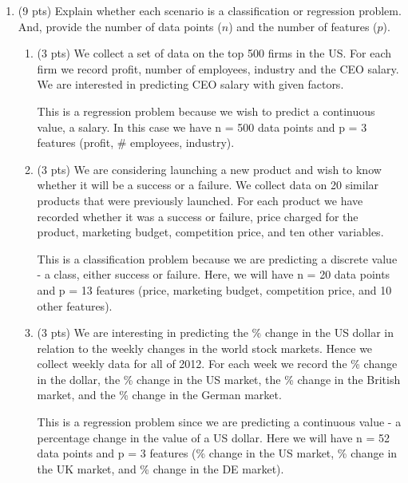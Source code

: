 \documentclass[a4paper]{article}
\theoremstyle{definition}
\newenvironment{soln}{
    \leavevmode\color{blue}\ignorespaces
}{}
\begin{document}
\begin{enumerate}
\item (9 pts) Explain whether each scenario is a classification or regression problem. And, provide the number of data points ($n$) and the number of features ($p$).

\begin{enumerate}
	\item (3 pts) We collect a set of data on the top 500 firms in the US. For each firm we record profit, number of employees, industry and the CEO salary. We are interested in predicting CEO salary with given factors.
	
	\begin{soln}  This is a regression problem because we wish to predict a continuous value, a salary. In this case we have n = 500 data points and p = 3 features (profit, \# employees, industry). \end{soln}
	
	\item (3 pts) We are considering launching a new product and wish to know whether it will be a success or a failure. We collect data on 20 similar products that were previously launched. For each product we have recorded whether it was a success or failure, price charged for the product, marketing budget, competition price, and ten other variables.
	
	\begin{soln}  This is a classification problem because we are predicting a discrete value - a class, either success or failure. Here, we will have n = 20 data points and p = 13 features (price, marketing budget, competition price, and 10 other features). \end{soln}
	
	\item (3 pts) We are interesting in predicting the \% change in the US dollar in relation to the weekly changes in the world stock markets. Hence we collect weekly data for all of 2012. For each week we record the \% change in the dollar, the \% change in the US market, the \% change in the British market, and the \% change in the German market.
	
	\begin{soln}  This is a regression problem since we are predicting a continuous value - a percentage change in the value of a US dollar. Here we will have n = 52 data points and p = 3 features (\% change in the US market, \% change in the UK market, and \% change in the DE market). \end{soln}
	

\end{enumerate}
\end{enumerate}
\end{document}
